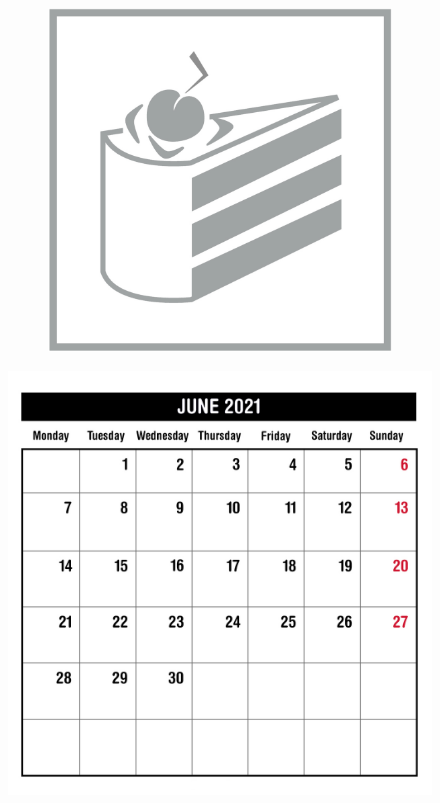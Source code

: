 \begin{figure}[H]
\begin{subfigure}[l]{0.195\linewidth}
  \end{subfigure}
  \begin{subfigure}[l]{0.195\linewidth}
    \includegraphics[width=\textwidth]{Sources/PortalIcons/d10.jpg}
  \end{subfigure}
\end{figure}


\newpage
\begin{figure}[H]
    \includegraphics[width=\textwidth]{Sources/MonthViews/June21.jpg}
\end{figure}

